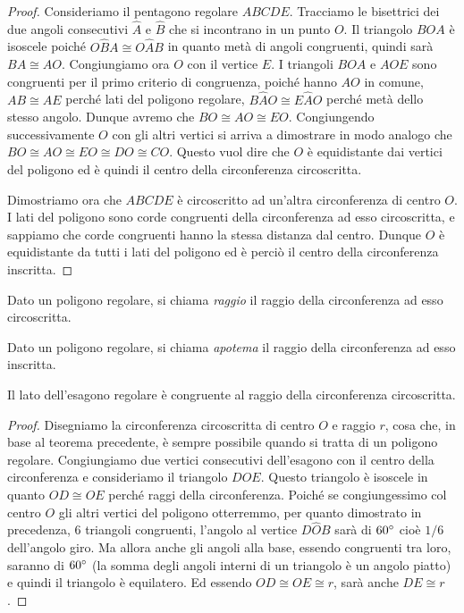 \begin{proof}
Consideriamo il pentagono regolare $ABCDE$. Tracciamo le bisettrici dei due angoli consecutivi $\widehat{A}$ e $\widehat{B}$ che si incontrano in un punto $O$. Il triangolo $BOA$ è isoscele poiché $O\widehat{B}A\cong O\widehat{A}B$ in quanto metà di angoli congruenti, quindi sarà $BA\cong AO$. Congiungiamo ora $O$ con il vertice $E$. I triangoli $BOA$ e $AOE$ sono congruenti per il primo criterio di congruenza, poiché hanno $AO$ in comune, $AB\cong AE$ perché lati del poligono regolare, $B\widehat{A}O\cong E\widehat{A}O$ perché metà dello stesso angolo. Dunque avremo che $BO\cong AO\cong EO$. Congiungendo successivamente $O$ con gli altri vertici si arriva a dimostrare in modo analogo che $BO\cong AO\cong EO\cong DO\cong CO$. Questo vuol dire che $O$ è equidistante dai vertici del poligono ed è quindi il centro della circonferenza circoscritta.

Dimostriamo ora che $ABCDE$ è circoscritto ad un'altra circonferenza di centro $O$. I lati del poligono sono corde congruenti della circonferenza ad esso circoscritta, e sappiamo che corde congruenti hanno la stessa distanza dal centro. Dunque $O$ è equidistante da tutti i lati del poligono ed è perciò il centro della circonferenza inscritta. 
\end{proof}

\begin{definizione}
Dato un poligono regolare, si chiama \emph{raggio} il raggio della circonferenza ad esso circoscritta.
\end{definizione}

\begin{definizione}
Dato un poligono regolare, si chiama \emph{apotema} il raggio della circonferenza ad esso inscritta.
\end{definizione}

\begin{teorema}
Il lato dell'esagono regolare è congruente al raggio della circonferenza circoscritta.
\end{teorema}

\begin{proof}
Disegniamo la circonferenza circoscritta di centro $O$ e raggio $r$, cosa che, in base al teorema precedente, è sempre possibile quando si tratta di un poligono regolare. Congiungiamo due vertici consecutivi dell'esagono con il centro della circonferenza e consideriamo il triangolo $DOE$. Questo triangolo è isoscele in quanto $OD\cong OE$ perché raggi della circonferenza. Poiché se congiungessimo col centro $O$ gli altri vertici del poligono otterremmo, per quanto dimostrato in precedenza, 6 triangoli congruenti, l'angolo al vertice $D\widehat{O}B$ sarà di $60{}^{\circ}$ cioè $1/6$ dell'angolo giro. Ma allora anche gli angoli alla base, essendo congruenti tra loro, saranno di $60{}^{\circ}$ (la somma degli angoli interni di un triangolo è un angolo piatto) e quindi il triangolo è equilatero. Ed essendo $OD\cong OE\cong r$, sarà anche $DE\cong r$. 
\end{proof}


\newpage



\cleardoublepage
